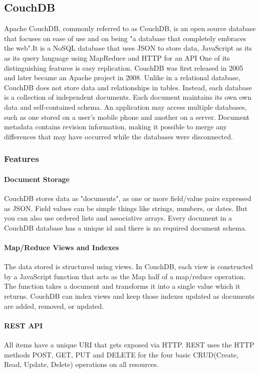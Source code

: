 \documentclass[a4paper,11pt,conference]{IEEEtran}
\begin{document}
		\subsection{CouchDB}

		Apache CouchDB, commonly referred to as CouchDB, is an open source database that focuses on ease of use and on being "a database that completely embraces the web".It is a NoSQL database that uses JSON to store data, JavaScript as its as its query language using  MapReduce and HTTP for an API One of its distinguishing features is easy replication. CouchDB was first released in 2005 and later became an Apache project in 2008.
		Unlike in a relational database, CouchDB does not store data and relationships in tables. Instead, each database is a collection of independent documents. Each document maintains its own own data and self-contained schema. An application may access multiple databases, such as one stored on a user's mobile phone and another on a server. Document metadata contains revision information, making it possible to merge any differences that may have occurred while the databases were disconnected.

		\subsubsection{Features}

			\paragraph{Document Storage}
			CouchDB stores data as "documents", as one or more field/value pairs expressed as JSON. Field values can be simple things like strings, numbers, or dates. But you can also use ordered lists and associative arrays. Every document in a CouchDB database has a unique id and there is no required document schema.

			\paragraph{Map/Reduce Views and Indexes}
			The data stored is structured using views. In CouchDB, each view is constructed by a JavaScript function that acts as the Map half of a map/reduce operation. The function takes a document and transforms it into a single value which it returns. CouchDB can index views and keep those indexes updated as documents are added, removed, or updated.

			\paragraph{REST API}
			All items have a unique URI that gets exposed via HTTP. REST uses the HTTP methods POST, GET, PUT and DELETE for the four basic CRUD(Create, Read, Update, Delete) operations on all resources.
\end{document}
